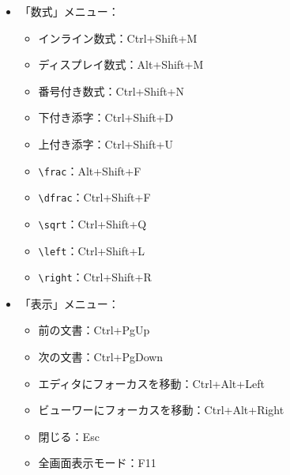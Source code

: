 \begin{itemize}
  \begin{itemize}
  \item
    箇条書きの項目(\verb+\item+)：Ctrl+Shift+I
  \item
    イタリック体：Ctrl+I
  \item
    スラント体：Ctrl+Shift+S
  \item
    ボールド体：Ctrl+B
  \item
    タイプライター体：Ctrl+Shift+T
  \item
    スモールキャップス体：Ctrl+Shift+C
  \item
    強調：Ctrl+Shift+E
  \item
    強制改行：Ctrl+Return
  \item
    \verb+begin{environment}+：Ctrl+E
  \item
    次のラベルに参照(\verb+\ref+)を挿入：Ctrl+Alt+R
  \end{itemize}
\item
  「数式」メニュー：

  \begin{itemize}
  \item
    インライン数式：Ctrl+Shift+M
  \item
    ディスプレイ数式：Alt+Shift+M
  \item
    番号付き数式：Ctrl+Shift+N
  \item
    下付き添字：Ctrl+Shift+D
  \item
    上付き添字：Ctrl+Shift+U
  \item
    \verb+\frac+：Alt+Shift+F
  \item
    \verb+\dfrac+：Ctrl+Shift+F
  \item
    \verb+\sqrt+：Ctrl+Shift+Q
  \item
    \verb+\left+：Ctrl+Shift+L
  \item
    \verb+\right+：Ctrl+Shift+R
  \end{itemize}
\item
  「表示」メニュー：

  \begin{itemize}
  \item
    前の文書：Ctrl+PgUp
  \item
    次の文書：Ctrl+PgDown
  \item
    エディタにフォーカスを移動：Ctrl+Alt+Left
  \item
    ビューワーにフォーカスを移動：Ctrl+Alt+Right
  \item
    閉じる：Esc
  \item
    全画面表示モード：F11
  \end{itemize}
\end{itemize}

